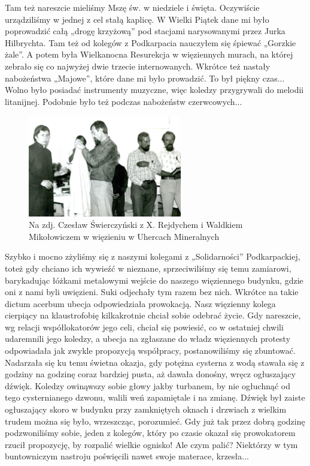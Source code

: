 Tam też nareszcie mieliśmy Mszę św. w niedziele i święta. Oczywiście urządziliśmy w jednej z cel stałą kaplicę. W Wielki Piątek dane mi było poprowadzić całą „drogę krzyżową” pod stacjami narysowanymi przez Jurka Hilbrychta. Tam też od kolegów z Podkarpacia nauczyłem się śpiewać „Gorzkie żale”. A potem była Wielkanocna Resurekcja w więziennych murach, na której zebrało się co najwyżej dwie trzecie internowanych. Wkrótce też nastały nabożeństwa „Majowe”, które dane mi było prowadzić. To był piękny czas... Wolno było posiadać instrumenty muzyczne, więc koledzy przygrywali do melodii litanijnej. Podobnie było też podczas nabożeństw czerwcowych...
\begin{figure}[!h]
\begin{center}
\includegraphics[width=0.6\textwidth]{photo/czeslaw_swierczynski_wiezienie_1.jpg}
\caption[Czesław Świerczyński w Uhercach Mineralnych]{Na zdj. Czesław Świerczyński z X. Rejdychem i Waldkiem Mikołowiczem w więzieniu w Uhercach Mineralnych}
\end{center}
\end{figure}

Szybko i mocno zżyliśmy się z naszymi kolegami z „Solidarności” Podkarpackiej, toteż gdy chciano ich wywieźć w nieznane, sprzeciwiliśmy się temu zamiarowi, barykadując łóżkami metalowymi wejście do naszego więziennego budynku, gdzie oni z nami byli uwięzieni. Suki odjechały tym razem bez nich. Wkrótce na takie dictum acerbum ubecja odpowiedziała prowokacją. Nasz więzienny kolega cierpiący na klaustrofobię kilkakrotnie chciał sobie odebrać życie. Gdy nareszcie, wg relacji współlokatorów jego celi, chciał się powiesić, co w ostatniej chwili udaremnili jego koledzy, a ubecja na zgłaszane do władz więziennych protesty odpowiadała jak zwykle propozycją współpracy, postanowiliśmy się zbuntować. Nadarzała się ku temu świetna okazja, gdy potężna cysterna z wodą stawała się z godziny na godzinę coraz bardziej pusta, aż dawała donośny, wręcz ogłuszający dźwięk. Koledzy owinąwszy sobie głowy jakby turbanem, by nie ogłuchnąć od tego cysternianego dzwonu, walili weń zapamiętale i na zmianę. Dźwięk był zaiste ogłuszający skoro w budynku przy zamkniętych oknach i drzwiach z wielkim trudem można się było, wrzeszcząc, porozumieć. Gdy już tak przez dobrą godzinę podzwoniliśmy sobie, jeden z kolegów, który po czasie okazał się prowokatorem rzucił propozycję, by rozpalić wielkie ognisko! Ale czym palić? Niektórzy w tym buntowniczym nastroju poświęcili nawet swoje materace, krzesła...

